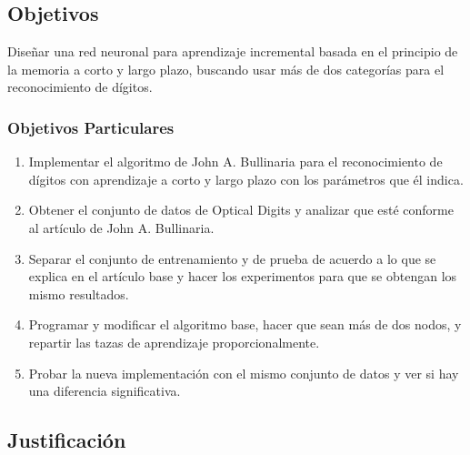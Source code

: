 \subsection{Objetivos}
    Diseñar una red neuronal para aprendizaje incremental basada en el principio de la memoria a corto y largo plazo, buscando usar más de dos categorías para el reconocimiento de dígitos.
    \subsubsection{Objetivos Particulares}
        \begin{enumerate}
            \item Implementar el algoritmo de John A. Bullinaria para el reconocimiento de dígitos con aprendizaje a corto y largo plazo con los parámetros que él indica.
            \item Obtener el conjunto de datos de Optical Digits y analizar que esté conforme al artículo de John A. Bullinaria.
            \item Separar el conjunto de entrenamiento y de prueba de acuerdo a lo que se explica en el artículo base y hacer los experimentos para que se obtengan los mismo resultados.
            \item Programar y modificar el algoritmo base, hacer que sean más de dos nodos, y repartir las tazas de aprendizaje proporcionalmente.
            \item Probar la nueva implementación con el mismo conjunto de datos y ver si hay una diferencia significativa.
        \end{enumerate}
\subsection{Justificaci\'on}

